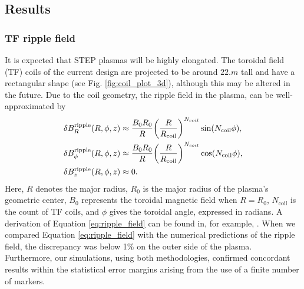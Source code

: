 \documentclass[10pt, a4paper, twoside]{article}
\begin{document}
\subsection{Results}

\subsubsection{TF ripple field}
\label{sec:tf_ripple_field}

It is expected that STEP plasmas will be highly elongated. The toroidal field (TF) coils of the current design are projected to be around $\si{22.m}$ tall and have a rectangular shape (see Fig. \ref{fig:coil_plot_3d}), although this may be altered in the future. Due to the coil geometry, the ripple field in the plasma, can be well-approximated by
\begin{equation}
    \label{eq:ripple_field}
    \begin{aligned}
        \delta B_R^{\text{ripple}}(R, \phi, z) &\approx \frac{B_0 R_0}{R} \qty(\frac{R}{R_{\text{coil}}})^{N_{coil}}\sin(N_{\text{coil}}\phi), \\
        \delta B_\phi^{\text{ripple}}(R, \phi, z) &\approx \frac{B_0 R_0}{R} \qty(\frac{R}{R_{\text{coil}}})^{N_{coil}}\cos(N_{\text{coil}}\phi),\\
        \delta B_z^{\text{ripple}}(R, \phi, z) &\approx 0.
    \end{aligned}
\end{equation}
Here, $R$ denotes the major radius, $R_0$ is the major radius of the plasma's geometric center, $B_0$ represents the toroidal magnetic field when $R=R_0$, $N_{\text{coil}}$ is the count of TF coils, and $\phi$ gives the toroidal angle, expressed in radians. A derivation of Equation \eqref{eq:ripple_field} can be found in, for example, \cite{mcclements2005}.  When we compared Equation \eqref{eq:ripple_field} with the numerical predictions of the ripple field, the discrepancy was below 1\% on the outer side of the plasma. Furthermore, our simulations, using both methodologies, confirmed concordant results within the statistical error margins arising from the use of a finite number of markers.
\end{document}
